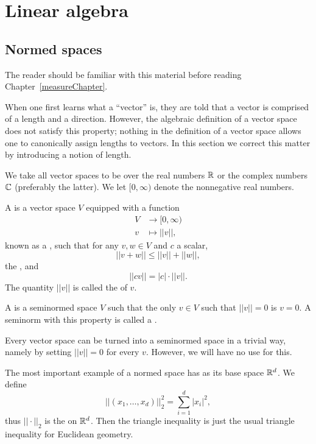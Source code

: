 \appendix
\chapter{Linear algebra}
\section{Normed spaces}
The reader should be familiar with this material before reading Chapter~\ref{measureChapter}.

When one first learns what a ``vector'' is, they are told that a vector is comprised of a length and a direction.
However, the algebraic definition of a vector space does not satisfy this property; nothing in the definition of a vector space allows one to canonically assign lengths to vectors.
In this section we correct this matter by introducing a notion of length.

We take all vector spaces to be over the real numbers $\mathbb{R}$ or the complex numbers $\mathbb{C}$ (preferably the latter).
We let $[0, \infty)$ denote the nonnegative real numbers.

\begin{definition}
A  is a vector space $V$ equipped with a function
\begin{align*}V &\to [0, \infty)\\
v &\mapsto ||v||,\end{align*}
known as a , such that for any $v, w \in V$ and $c$ a scalar,
\[||v + w|| \leq ||v|| + ||w||,\]
the , and
\[||cv|| = |c|\cdot||v||.\]
The quantity $||v||$ is called the  of $v$.

A  is a seminormed space $V$ such that the only $v \in V$ such that $||v|| = 0$ is $v = 0$.
A seminorm with this property is called a .
\end{definition}

\begin{example}
Every vector space can be turned into a seminormed space in a trivial way, namely by setting $||v|| = 0$ for every $v$.
However, we will have no use for this.
\end{example}

\begin{example}
The most important example of a normed space has as its base space $\mathbb{R}^d$.
We define
\[||(x_1, \dots, x_d)||_2^2 = \sum_{i=1}^{d} |x_i|^2,\]
thus $||\cdot||_2$ is the  on $\mathbb{R}^d$.
Then the triangle inequality is just the usual triangle inequality for Euclidean geometry.
\end{example}

